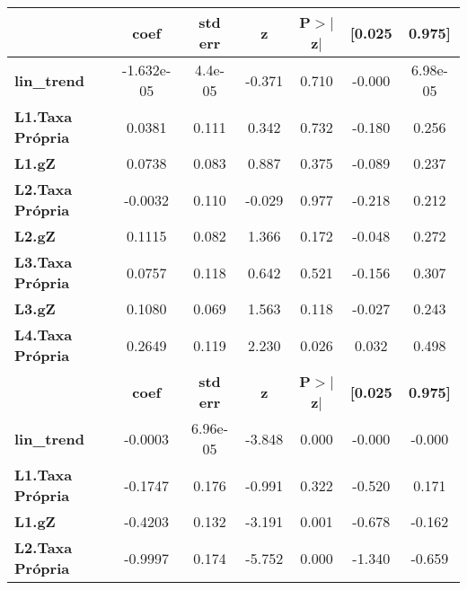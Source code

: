 \begin{center}
\begin{tabular}{lcccccc}
\toprule
                         & \textbf{coef} & \textbf{std err} & \textbf{z} & \textbf{P$> |$z$|$} & \textbf{[0.025} & \textbf{0.975]}  \\
\midrule
\textbf{lin\_trend}      &   -1.632e-05  &      4.4e-05     &    -0.371  &         0.710        &       -0.000    &     6.98e-05     \\
\textbf{L1.Taxa Própria} &       0.0381  &        0.111     &     0.342  &         0.732        &       -0.180    &        0.256     \\
\textbf{L1.gZ}           &       0.0738  &        0.083     &     0.887  &         0.375        &       -0.089    &        0.237     \\
\textbf{L2.Taxa Própria} &      -0.0032  &        0.110     &    -0.029  &         0.977        &       -0.218    &        0.212     \\
\textbf{L2.gZ}           &       0.1115  &        0.082     &     1.366  &         0.172        &       -0.048    &        0.272     \\
\textbf{L3.Taxa Própria} &       0.0757  &        0.118     &     0.642  &         0.521        &       -0.156    &        0.307     \\
\textbf{L3.gZ}           &       0.1080  &        0.069     &     1.563  &         0.118        &       -0.027    &        0.243     \\
\textbf{L4.Taxa Própria} &       0.2649  &        0.119     &     2.230  &         0.026        &        0.032    &        0.498     \\
                         & \textbf{coef} & \textbf{std err} & \textbf{z} & \textbf{P$> |$z$|$} & \textbf{[0.025} & \textbf{0.975]}  \\
\midrule
\textbf{lin\_trend}      &      -0.0003  &     6.96e-05     &    -3.848  &         0.000        &       -0.000    &       -0.000     \\
\textbf{L1.Taxa Própria} &      -0.1747  &        0.176     &    -0.991  &         0.322        &       -0.520    &        0.171     \\
\textbf{L1.gZ}           &      -0.4203  &        0.132     &    -3.191  &         0.001        &       -0.678    &       -0.162     \\
\textbf{L2.Taxa Própria} &      -0.9997  &        0.174     &    -5.752  &         0.000        &       -1.340    &       -0.659     \\

\end{tabular}
\end{center}
